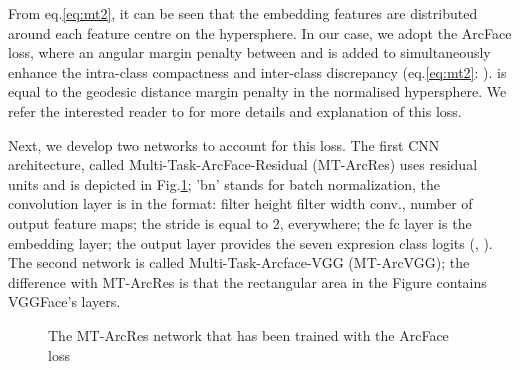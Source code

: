 \documentclass{bmvc2k}
\begin{document}
From eq.\ref{eq:mt2}, it can be seen that the embedding features are distributed around each feature centre on the hypersphere. In our case, we adopt the ArcFace loss, where an angular margin penalty \textit{} between   and  is added to simultaneously
enhance the intra-class compactness and inter-class discrepancy (eq.\ref{eq:mt2}: ).  \textit{} is equal to the geodesic distance margin penalty in the normalised hypersphere. We refer the interested reader to \cite{deng2018arcface} for more details and explanation of this loss.


Next, we develop two networks to account for this loss. The first CNN architecture, called Multi-Task-ArcFace-Residual (MT-ArcRes) uses residual units and is depicted in Fig.\ref{ArcResnet}; 'bn' stands for batch normalization, the convolution layer is in the format: filter height  filter width conv., number of output feature maps; the stride is equal to 2, everywhere; the fc layer is the embedding layer; the output layer provides the seven expresion class logits (, ). The second network is called  Multi-Task-Arcface-VGG (MT-ArcVGG); the difference with MT-ArcRes is that the rectangular area in the Figure contains VGGFace's  layers. 





\begin{figure}[h]
\centering
{}
\caption{The MT-ArcRes network that has been trained with the ArcFace loss}
\label{ArcResnet}
\end{figure}
\end{document}
